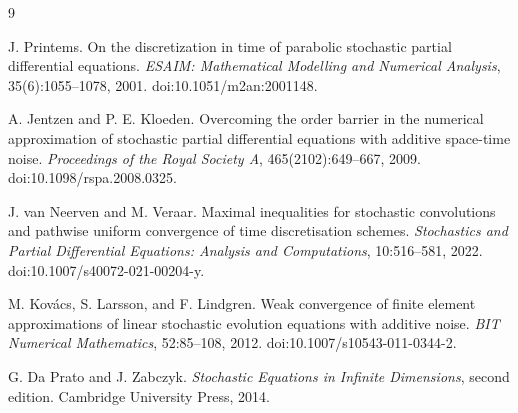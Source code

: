 \documentclass[11pt]{article}
\theoremstyle{remark}
\begin{document}
\begin{thebibliography}{9}

J. Printems.
\newblock On the discretization in time of parabolic stochastic partial differential equations.
\newblock \emph{ESAIM: Mathematical Modelling and Numerical Analysis}, 35(6):1055--1078, 2001.
\newblock doi:10.1051/m2an:2001148.

A. Jentzen and P. E. Kloeden.
\newblock Overcoming the order barrier in the numerical approximation of stochastic partial differential equations with additive space-time noise.
\newblock \emph{Proceedings of the Royal Society A}, 465(2102):649--667, 2009.
\newblock doi:10.1098/rspa.2008.0325.

J. van Neerven and M. Veraar.
\newblock Maximal inequalities for stochastic convolutions and pathwise uniform convergence of time discretisation schemes.
\newblock \emph{Stochastics and Partial Differential Equations: Analysis and Computations}, 10:516--581, 2022.
\newblock doi:10.1007/s40072-021-00204-y.

M. Kov\'acs, S. Larsson, and F. Lindgren.
\newblock Weak convergence of finite element approximations of linear stochastic evolution equations with additive noise.
\newblock \emph{BIT Numerical Mathematics}, 52:85--108, 2012.
\newblock doi:10.1007/s10543-011-0344-2.

G. Da Prato and J. Zabczyk.
\newblock \emph{Stochastic Equations in Infinite Dimensions}, second edition.
\newblock Cambridge University Press, 2014.

\end{thebibliography}
\end{document}
